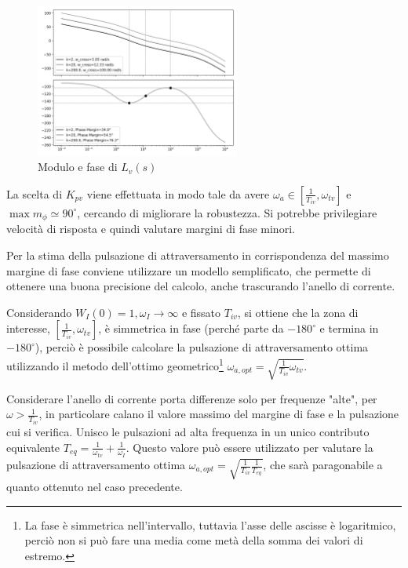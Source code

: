 \begin{figure}[h]
    \centering
    \includegraphics[width=0.6\textwidth]{Immagini/anello_aperto_anello_corrente.png}
    \caption{Modulo e fase di \(L_v(s)\)}
\end{figure}

La scelta di \(K_{pv}\) viene effettuata in modo tale da avere \(\omega_a \in \left[\frac{1}{T_{iv}}, \omega_{tv}\right]\) e \(\max{m_\phi} \simeq 90^\circ\), cercando di migliorare la robustezza. Si potrebbe privilegiare velocità di risposta e quindi valutare margini di fase minori.

Per la stima della pulsazione di attraversamento in corrispondenza del massimo margine di fase conviene utilizzare un modello semplificato, che permette di ottenere una buona precisione del calcolo, anche trascurando l'anello di corrente.

Considerando \(W_I(0)=1, \omega_I\rightarrow \infty\) e fissato \(T_{iv}\), si ottiene che la zona di interesse, \(\left[\frac{1}{T_{iv}}, \omega_{tv}\right]\), è simmetrica in fase (perché parte da \(-180^\circ\) e termina in \(-180^\circ\)),  perciò è possibile calcolare la pulsazione di attraversamento ottima utilizzando il metodo dell'ottimo geometrico\footnote{La fase è simmetrica nell'intervallo, tuttavia l'asse delle ascisse è logaritmico, perciò non si può fare una media come metà della somma dei valori di estremo.} \(\omega_{a,opt} = \sqrt{\frac{1}{T_{iv}}\omega_{tv}}\).

Considerare l'anello di corrente porta differenze solo per frequenze "alte", per \(\omega>\frac{1}{T_{iv}}\), in particolare calano il valore massimo del margine di fase e la pulsazione cui si verifica. Unisco le pulsazioni ad alta frequenza in un unico contributo equivalente \(T_{eq}=\frac{1}{\omega_{tv}}+\frac{1}{\omega_I}\). Questo valore può essere utilizzato per valutare la pulsazione di attraversamento ottima \(\omega_{a,opt} = \sqrt{\frac{1}{T_{iv}}\frac{1}{T_{eq}}}\), che sarà paragonabile a quanto ottenuto nel caso precedente.


